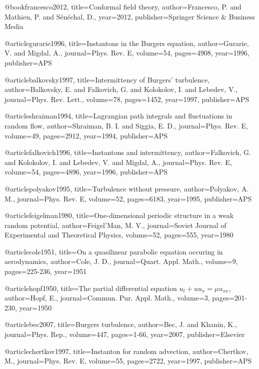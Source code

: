   @book{francesco2012,
    title={Conformal field theory},
    author={Francesco, P. and Mathieu, P. and S{\'e}n{\'e}chal, D.},
    year={2012},
    publisher={Springer Science \& Business Media}
  }


@article{gurarie1996,
  title={{Instantons in the Burgers equation}},
  author={Gurarie, V. and Migdal, A.},
  journal={Phys. Rev. E},
  volume={54},
  pages={4908},
  year={1996},
  publisher={APS}
}


@article{balkovsky1997,
  title={{Intermittency of Burgers' turbulence}},
  author={Balkovsky, E. and Falkovich, G. and Kolokolov, I. and Lebedev, V.},
  journal={Phys. Rev. Lett.},
  volume={78},
  pages={1452},
  year={1997},
  publisher={APS}
}

@article{shraiman1994,
  title={{Lagrangian path integrals and fluctuations in random flow}},
  author={Shraiman, B. I. and Siggia, E. D.},
  journal={Phys. Rev. E},
  volume={49},
  pages={2912},
  year={1994},
  publisher={APS}
}

@article{falkovich1996,
  title={Instantons and intermittency},
  author={Falkovich, G. and Kolokolov, I. and Lebedev, V. and Migdal, A.},
  journal={Phys. Rev. E},
  volume={54},
  pages={4896},
  year={1996},
  publisher={APS}
}

@article{polyakov1995,
  title={Turbulence without pressure},
  author={Polyakov, A. M.},
  journal={Phys. Rev. E},
  volume={52},
  pages={6183},
  year={1995},
  publisher={APS}
}

@article{feigelman1980,
  title={One-dimensional periodic structure in a weak random potential},
  author={Feigel'Man, M. V.},
  journal={Soviet Journal of Experimental and Theoretical Physics},
  volume={52},
  pages={555},
  year={1980}
}

@article{cole1951,
  title={On a quasilinear parabolic equation occuring in aerodynamics},
  author={Cole, J. D.},
  journal={Quart. Appl. Math.},
  volume={9},
  pages={225-236},
  year={1951}
  }

@article{hopf1950,
  title={{The partial differential equation $u_t + u u_x = \mu u_{xx}$}},
  author={Hopf, E.},
  journal={Commun. Pur. Appl. Math.},
  volume={3},
  pages={201-230},
  year={1950}
  }

@article{bec2007,
  title={Burgers turbulence},
  author={Bec, J. and Khanin, K.},
  journal={Phys. Rep.},
  volume={447},
  pages={1-66},
  year={2007},
  publisher={Elsevier}
}

@article{chertkov1997,
  title={Instanton for random advection},
  author={Chertkov, M.},
  journal={Phys. Rev. E},
  volume={55},
  pages={2722},
  year={1997},
  publisher={APS}
}

